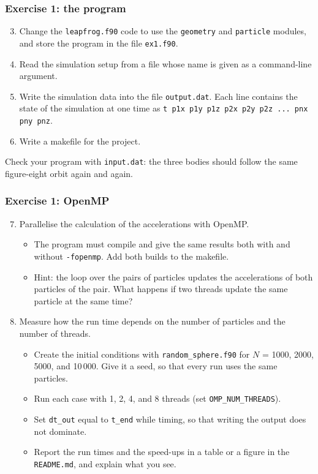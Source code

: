 \begin{frame}
  \frametitle{Exercise 1: the program}
  \begin{enumerate}
    \setcounter{enumi}{2}
    \item Change the \texttt{leapfrog.f90} code to use the \texttt{geometry} and \texttt{particle} modules, and store the program in the file \texttt{ex1.f90}.
    \item Read the simulation setup from a file whose name is given as a command-line argument.
    \item Write the simulation data into the file \texttt{output.dat}. Each line contains the state of the simulation at one time as \texttt{t p1x p1y p1z p2x p2y p2z ... pnx pny pnz}.
    \item Write a makefile for the project.
  \end{enumerate}

  \vspace*{3mm}
  Check your program with \texttt{input.dat}: the three bodies should follow the same figure-eight orbit again and again.
\end{frame}


\begin{frame}
  \frametitle{Exercise 1: OpenMP}
  \begin{enumerate}
    \setcounter{enumi}{6}
    \item Parallelise the calculation of the accelerations with OpenMP.
      \begin{itemize}
        \item The program must compile and give the same results both with and without \texttt{-fopenmp}. Add both builds to the makefile.
        \item Hint: the loop over the pairs of particles updates the accelerations of both particles of the pair. What happens if two threads update the same particle at the same time?
      \end{itemize}
    \item Measure how the run time depends on the number of particles and the number of threads.
      \begin{itemize}
        \item Create the initial conditions with \texttt{random\_sphere.f90} for $N$ = 1000, 2000, 5000, and 10\,000. Give it a seed, so that every run uses the same particles.
        \item Run each case with 1, 2, 4, and 8 threads (set \texttt{OMP\_NUM\_THREADS}).
        \item Set \texttt{dt\_out} equal to \texttt{t\_end} while timing, so that writing the output does not dominate.
        \item Report the run times and the speed-ups in a table or a figure in the \texttt{README.md}, and explain what you see.
      \end{itemize}
  \end{enumerate}
\end{frame}


